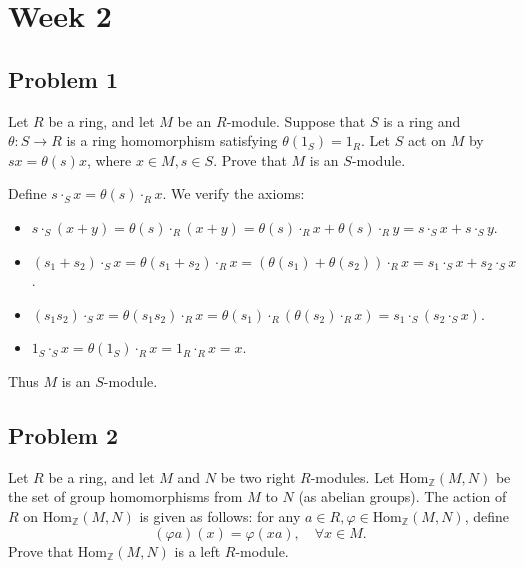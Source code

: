 \section{Week 2}
\subsection*{Problem 1}
Let $R$ be a ring, and let $M$ be an $R$-module. Suppose that $S$ is a ring and $\theta : S \to R$ is a ring homomorphism satisfying $\theta(1_S) = 1_R$. Let $S$ act on $M$ by $sx = \theta(s)x$, where $x \in M, s \in S$. Prove that $M$ is an $S$-module.

\begin{solution}
Define $s \cdot_S x = \theta(s) \cdot_R x$. We verify the axioms:
\begin{itemize}
    \item $s \cdot_S (x+y) = \theta(s) \cdot_R (x+y) = \theta(s) \cdot_R x + \theta(s) \cdot_R y = s \cdot_S x + s \cdot_S y$.
    \item $(s_1 + s_2) \cdot_S x = \theta(s_1 + s_2) \cdot_R x = (\theta(s_1) + \theta(s_2)) \cdot_R x = s_1 \cdot_S x + s_2 \cdot_S x$.
    \item $(s_1 s_2) \cdot_S x = \theta(s_1 s_2) \cdot_R x = \theta(s_1) \cdot_R (\theta(s_2) \cdot_R x) = s_1 \cdot_S (s_2 \cdot_S x)$.
    \item $1_S \cdot_S x = \theta(1_S) \cdot_R x = 1_R \cdot_R x = x$.
\end{itemize}
Thus $M$ is an $S$-module.
\end{solution}

\subsection*{Problem 2}
Let $R$ be a ring, and let $M$ and $N$ be two right $R$-modules. Let $\text{Hom}_{\mathbb{Z}}(M, N)$ be the set of group homomorphisms from $M$ to $N$ (as abelian groups). The action of $R$ on $\text{Hom}_{\mathbb{Z}}(M, N)$ is given as follows: for any $a \in R, \varphi \in \text{Hom}_{\mathbb{Z}}(M, N)$, define
\[ (\varphi a)(x) = \varphi(xa), \quad \forall x \in M. \]
Prove that $\text{Hom}_{\mathbb{Z}}(M, N)$ is a left $R$-module.

